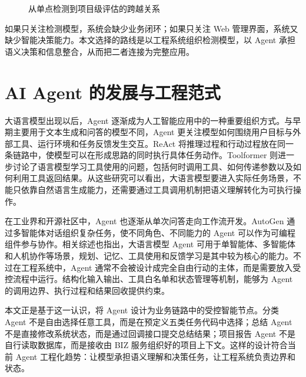 \begin{figure}[!htb]
{%
  }
  \caption{从单点检测到项目级评估的跨越关系}
  \label{fig:foundation-single-detection-to-project-assessment-transition}
\end{figure}

如果只关注检测模型，系统会缺少业务闭环；如果只关注 Web 管理界面，系统又缺少智能决策能力。本文选择的路线是以工程系统组织检测模型，以 Agent 承担语义决策和信息整合，从而把二者连接为完整应用。

\section{AI Agent 的发展与工程范式}
\label{sec:foundation-artificial-intelligence-agent-development-and-engineering-paradigm}

大语言模型出现以后，Agent 逐渐成为人工智能应用中的一种重要组织方式。与早期主要用于文本生成和问答的模型不同，Agent 更关注模型如何围绕用户目标与外部工具、运行环境和任务反馈发生交互。ReAct 将推理过程和行动过程放在同一条链路中，使模型可以在形成思路的同时执行具体任务动作\cite{yao2023react}。Toolformer 则进一步讨论了语言模型学习工具使用的问题，包括何时调用工具、如何传递参数以及如何利用工具返回结果\cite{schick2023toolformer}。从这些研究可以看出，大语言模型要进入实际任务场景，不能只依靠自然语言生成能力，还需要通过工具调用机制把语义理解转化为可执行操作。

在工业界和开源社区中，Agent 也逐渐从单次问答走向工作流开发。AutoGen 通过多智能体对话组织复杂任务，使不同角色、不同能力的 Agent 可以作为可编程组件参与协作\cite{wu2023autogen}。相关综述也指出，大语言模型 Agent 可用于单智能体、多智能体和人机协作等场景，规划、记忆、工具使用和反馈学习是其中较为核心的能力\cite{wang2023llmagents}。不过在工程系统中，Agent 通常不会被设计成完全自由行动的主体，而是需要放入受控流程中运行。结构化输入输出、工具白名单和状态管理等机制，能够为 Agent 的调用边界、执行过程和结果回收提供约束。

本文正是基于这一认识，将 Agent 设计为业务链路中的受控智能节点。分类 Agent 不是自由选择任意工具，而是在预定义五类任务代码中选择；总结 Agent 不是直接修改系统状态，而是通过回调接口提交总结结果；项目报告 Agent 不是自行读取数据库，而是接收由 BIZ 服务组织好的项目上下文。这样的设计符合当前 Agent 工程化趋势：让模型承担语义理解和决策任务，让工程系统负责边界和状态。

